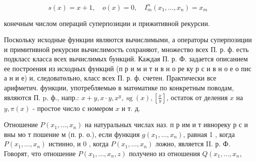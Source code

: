 \documentclass[10pt]{article}
\begin{document}
\[

s(x)=x+1, \quad o(x)=0, \quad I_{m}^{n}\left(x_{1}, \ldots, x_{n}\right)=x_{m}

\]



конечным числом операций суперпозиции и прижитивной рекурсии.



Поскольку исходные функции являются вычислимыми, а операторы суперпозиции и примитивной рекурсии вычислимость сохраняют, множество всех П. р. ф. есть подкласс класса всех вычислимых бункций. Каждая П. р. Ф. задается описанием ее построения из исходных функций (п р и м и т и в н о ре ку р с и в н о е о пис а н и е) и, следоватөльно, класс всех П. р. ф. счетен. Практически все арифметич. функции, употребляемыө в матөматике по конкретным поводам, являются П. p. ф., напр.: $x+y, x \cdot y, x^{y}, \operatorname{sg}(x),\left[\frac{x}{y}\right]$, остаток от деления $x$ на $y, \pi(x)$ - простое число с номером $x$ и т. д.



Отношение $P\left(x_{1}, \ldots, x_{n}\right)$ на натуральных числах наз. п р им и т ивнореку р с и вны мо т пошение м (п. р. о.), если функция $g\left(x_{1}, \ldots, x_{n}\right)$, равная 1 , когда $P\left(x_{1}, \ldots, x_{n}\right)$ истинно, и 0 , когда $P\left(x_{1}, \ldots, x_{n}\right)$ ложно, является II. р. Ф. Говорят, что отношение $P\left(x_{1}, \ldots, x_{n}, z\right)$ получено из отношения $Q\left(x_{1}, \ldots, x_{n}\right.$,
\end{document}
